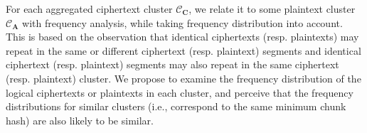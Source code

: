 \documentclass[bachelor]{thesis-uestc}
\begin{document}

For each aggregated ciphertext cluster $\mathcal{C}_\mathbf{C}$, we relate it to some plaintext cluster $\mathcal{C}_\mathbf{A}$ with frequency analysis, while taking frequency distribution into account. This is based on the observation that identical ciphertexts (resp. plaintexts) may  repeat in the same or different ciphertext (resp. plaintext) segments and identical ciphertext (resp. plaintext) segments may also repeat in the same ciphertext (resp. plaintext) cluster. We propose to examine the frequency distribution of the logical ciphertexts or plaintexts in each cluster, and perceive that the frequency distributions for similar clusters (i.e., correspond to the same minimum chunk hash) are also likely to be similar. 
\end{document}
